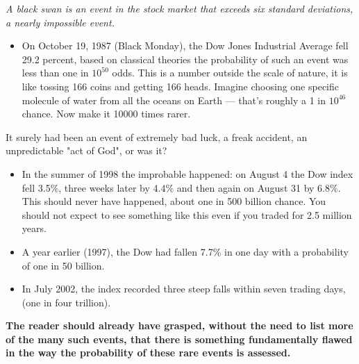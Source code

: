 \textit{A black swan is an event in the stock market that exceeds six standard deviations, a nearly impossible event. }
\begin{itemize}
    \item On October 19, 1987 (Black Monday), the Dow Jones Industrial Average fell 29.2 percent, based on classical theories the probability of such an event was less than one in $10^{50}$ odds. This is a number outside the scale of nature, it is like tossing 166 coins and getting 166 heads. Imagine choosing one specific molecule of water from all the oceans on Earth — that’s roughly a 1 in $10^{46}$ chance. Now make it 10000 times rarer.
\end{itemize}
It surely had been an event of extremely bad luck, a freak accident, an unpredictable "act of God", or was it?
\begin{itemize}

\item In the summer of 1998 the improbable happened: on August 4 the Dow index fell 3.5$\%$, three weeks later by 4.4$\%$ and then again on August 31 by 6.8$\%$. This should never have happened, about one in 500 billion chance. You should not expect to see something like this even if you traded for 2.5 million years.
\item A year earlier (1997), the Dow had fallen 7.7$\%$ in one day with a probability of one in 50 billion.
\item In July 2002, the index recorded three steep falls within seven trading days, (one in four trillion).
\end{itemize}
\textbf{The reader should already have grasped, without the need to list more of the many such events, that there is something fundamentally flawed in the way the probability of these rare events is assessed.}